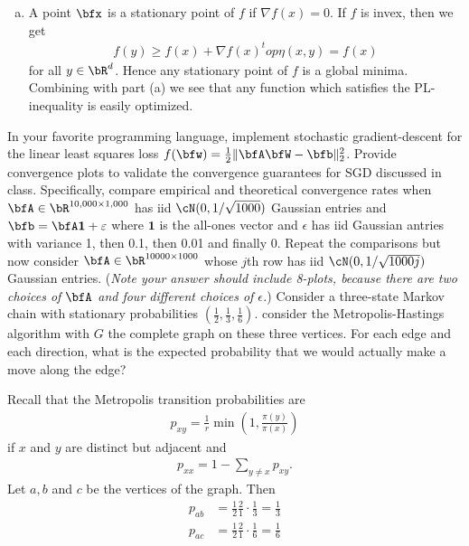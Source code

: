 \begin{homework}[e]
\begin{prf}
\begin{enumerate}[(a)]
      \item A point $\bfx$ is a stationary point of $f$ if $\nabla f(x) = 0$. If $f$ is invex, then we get
        \begin{align*}
          f(y) \geq f(x) + \nabla f(x)^top \eta(x,y) = f(x)
        \end{align*}
        for all $y\in \bR^d$. Hence any stationary point of $f$ is a global minima. Combining with part (a) we see that any function which satisfies the PL-inequality is easily optimized.
    \end{enumerate}
  \end{prf}
  \prob In your favorite programming language, implement stochastic gradient-descent for the linear least squares loss $f(\bfw) = \frac{1}{2}\|\bfA\bfW - \bfb\|^2_2$. Provide convergence plots to validate the convergence guarantees for SGD discussed in class. Specifically, compare empirical and theoretical convergence rates when $\bfA \in \bR^{10,000\times 1,000}$ has iid $\cN(0, 1/\sqrt{1000})$ Gaussian entries and $\bfb = \bfA\mathbf{1} + \epsilon$ where $\mathbf{1}$ is the all-ones vector and $\epsilon$ has iid Gaussian antries with variance 1, then 0.1, then 0.01 and finally 0. Repeat the comparisons but now consider $\bfA \in \bR^{10000 \times 1000}$ whose $j$th row has iid $\cN(0,1/\sqrt{1000j})$ Gaussian entries. (\emph{Note your answer should include 8-plots, because there are two choices of $\bfA$ and four different choices of $\epsilon$.})
  \prob Consider a three-state Markov chain with stationary probabilities $\left(\frac{1}{2}, \frac{1}{3},\frac{1}{6}\right)$. consider the Metropolis-Hastings algorithm with $G$ the complete graph on these three vertices. For each edge and each direction, what is the expected probability that we would actually make a move along the edge?
  \begin{prf}
    Recall that the Metropolis transition probabilities are
    \begin{align*}
      p_{xy} = \frac{1}{r}\min \left(1, \frac{\pi(y)}{\pi(x)}\right) 
    \end{align*}
    if $x$ and $y$ are distinct but adjacent and
    \begin{align*}
      p_{xx} = 1 - \sum_{y\neq x} p_{xy}.
    \end{align*}
    Let $a,b$ and $c$ be the vertices of the graph. Then
    \begin{align*}
      p_{ab} &= \frac{1}{2}\frac{2}{1}\cdot \frac{1}{3} = \frac{1}{3} \\
      p_{ac} &= \frac{1}{2}\frac{2}{1}\cdot \frac{1}{6} = \frac{1}{6} \\

\end{align*}
\end{prf}
\end{homework}
